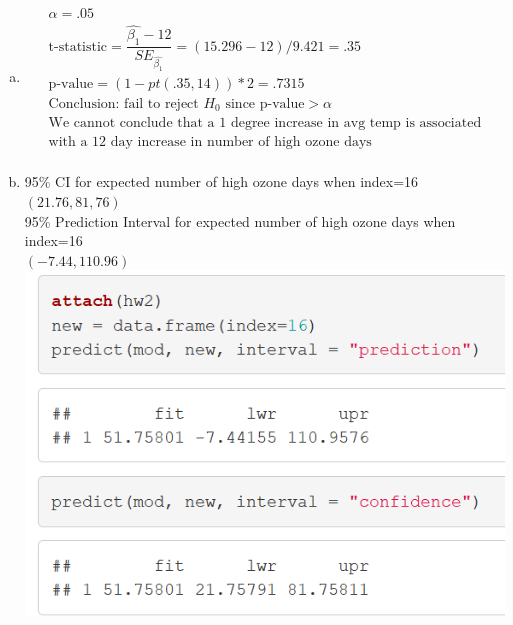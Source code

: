 \documentclass{article}
\newcommand{\B}{\beta}
\begin{document}
\begin{flushleft}
\begin{enumerate}[(a)]
	\item 
\begin{multline*}\\
\alpha=.05\\
\text{t-statistic}=\dfrac{\hat{\B_1}-12}{SE_{\hat{\B_1}}}=(15.296-12)/9.421=.35\\
\text{p-value}=(1-pt(.35,14))*2=.7315\\
\text{Conclusion: fail to reject } H_0 \text{ since p-value}>\alpha\\
\text{We cannot conclude that a 1 degree increase in avg temp is associated}\\
\text{with a 12 day increase in number of high ozone days}\\
\end{multline*}

	\item 
95\% CI for expected number of high ozone days when index=16\\
$(21.76,81,76)$\\
95\% Prediction Interval for expected number of high ozone days when index=16\\
$(-7.44,110.96)$\\
\includegraphics[scale=.7]{conf.png}\\
\end{enumerate}

\end{flushleft}
\end{document}
